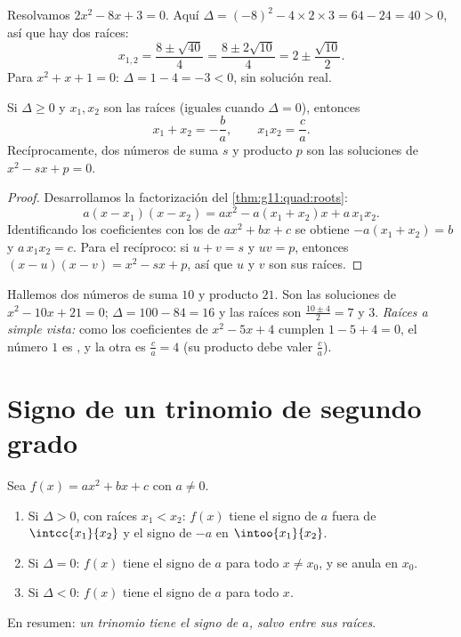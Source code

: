 \begin{example}\label{ex:g11:quad:solving}
Resolvamos $2x^2 - 8x + 3 = 0$. Aquí
$\Delta = (-8)^2 - 4 \times 2 \times 3 = 64 - 24 = 40 > 0$, así que hay
dos raíces:
\[
x_{1,2} = \frac{8 \pm \sqrt{40}}{4} = \frac{8 \pm 2\sqrt{10}}{4}
= 2 \pm \frac{\sqrt{10}}{2}.
\]
Para $x^2 + x + 1 = 0$: $\Delta = 1 - 4 = -3 < 0$, sin solución real.
\end{example}

\begin{proposition}\label{prop:g11:quad:vieta}
Si $\Delta \geq 0$ y $x_1, x_2$ son las raíces (iguales cuando
$\Delta = 0$), entonces
\[
x_1 + x_2 = -\frac{b}{a},
\qquad
x_1 x_2 = \frac{c}{a} .
\]
Recíprocamente, dos números de suma $s$ y producto $p$ son las soluciones
de $x^2 - sx + p = 0$.
\end{proposition}

\begin{proof}
Desarrollamos la factorización del \cref{thm:g11:quad:roots}:
\[
a(x - x_1)(x - x_2) = a x^2 - a(x_1 + x_2)x + a\,x_1 x_2 .
\]
Identificando los coeficientes con los de $ax^2 + bx + c$ se obtiene
$-a(x_1+x_2) = b$ y $a\,x_1x_2 = c$. Para el recíproco: si $u + v = s$ y
$uv = p$, entonces $(x-u)(x-v) = x^2 - sx + p$, así que $u$ y $v$ son sus
raíces.
\end{proof}

\begin{example}
Hallemos dos números de suma $10$ y producto $21$. Son las soluciones de
$x^2 - 10x + 21 = 0$; $\Delta = 100 - 84 = 16$ y las raíces son
$\frac{10 \pm 4}{2} = 7$ y $3$. \emph{Raíces a simple vista:} como los
coeficientes de $x^2 - 5x + 4$ cumplen $1 - 5 + 4 = 0$, el número $1$ es
, y la otra es $\frac{c}{a} = 4$ (su producto debe valer
$\frac ca$).
\end{example}

\section{Signo de un trinomio de segundo grado}

\begin{theorem}\label{thm:g11:quad:sign}
Sea $f(x) = ax^2+bx+c$ con $a \neq 0$.
\begin{enumerate}
  \item Si $\Delta > 0$, con raíces $x_1 < x_2$: $f(x)$ tiene el signo de
        $a$ fuera de $\intcc{x_1}{x_2}$ y el signo de $-a$ en
        $\intoo{x_1}{x_2}$.
  \item Si $\Delta = 0$: $f(x)$ tiene el signo de $a$ para todo
        $x \neq x_0$, y se anula en $x_0$.
  \item Si $\Delta < 0$: $f(x)$ tiene el signo de $a$ para todo $x$.
\end{enumerate}
En resumen: \emph{un trinomio tiene el signo de $a$, salvo entre sus
raíces}.
\end{theorem}

